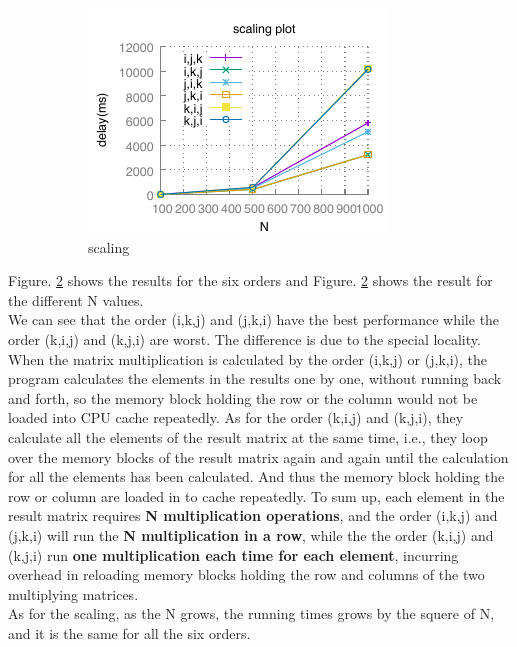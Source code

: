 \documentclass{article}
\begin{document}
\begin{figure}[h!]
\begin{subfigure}[b]{0.3\linewidth}
          \includegraphics[width=\linewidth]{matrix_scaling.pdf}
          \caption{scaling}
          \label{fig:scaling}
        \end{subfigure}
        \caption{\label{fig:part1}}
    \end{figure}

\indent Figure. \ref{fig:part1}  shows the results for the six orders and Figure. \ref{fig:part1}  shows the result for the different N values. \\
\indent We can see that the order (i,k,j) and (j,k,i) have the best performance while the order (k,i,j) and (k,j,i) are worst. The difference is due to the special locality. When the matrix multiplication is calculated by the order (i,k,j) or (j,k,i), the program calculates the elements in the results one by one, without running back and forth, so the memory block holding the row or the column would not be loaded into CPU cache repeatedly. As for the order (k,i,j) and (k,j,i), they calculate all the elements of the result matrix at the same time, i.e., they loop over the memory blocks of the result matrix again and again until the calculation for all the elements has been calculated. And thus the memory block holding the row or column are loaded in to cache repeatedly. To sum up, each element in the result matrix requires \textbf{N multiplication operations}, and the order (i,k,j) and (j,k,i) will run the \textbf{N multiplication in a row}, while the the order (k,i,j) and (k,j,i) run \textbf{one multiplication each time for each element}, incurring overhead in reloading memory blocks holding the row and columns of the two multiplying matrices.\\
\indent As for the scaling, as the N grows, the running times grows by the squere of N, and it is the same for all the six orders.
\end{document}
